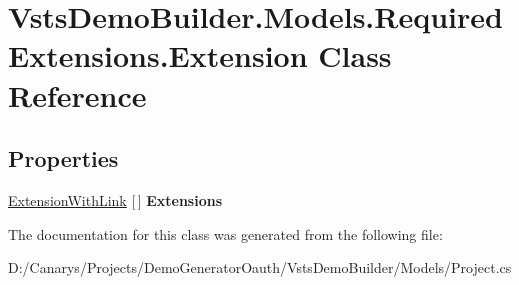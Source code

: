 \hypertarget{class_vsts_demo_builder_1_1_models_1_1_required_extensions_1_1_extension}{}\section{Vsts\+Demo\+Builder.\+Models.\+Required\+Extensions.\+Extension Class Reference}
\label{class_vsts_demo_builder_1_1_models_1_1_required_extensions_1_1_extension}
\subsection*{Properties}
\begin{DoxyCompactItemize}
\item 
\mbox{\label{class_vsts_demo_builder_1_1_models_1_1_required_extensions_1_1_extension_aed03e95fbcf10bd7d2753e5df7abf4ff}} 
\mbox{\hyperlink{class_vsts_demo_builder_1_1_models_1_1_required_extensions_1_1_extension_with_link}{Extension\+With\+Link}} \mbox{[}$\,$\mbox{]} {\bfseries Extensions}
\end{DoxyCompactItemize}


The documentation for this class was generated from the following file\+:\begin{DoxyCompactItemize}
\item 
D\+:/\+Canarys/\+Projects/\+Demo\+Generator\+Oauth/\+Vsts\+Demo\+Builder/\+Models/Project.\+cs\end{DoxyCompactItemize}
